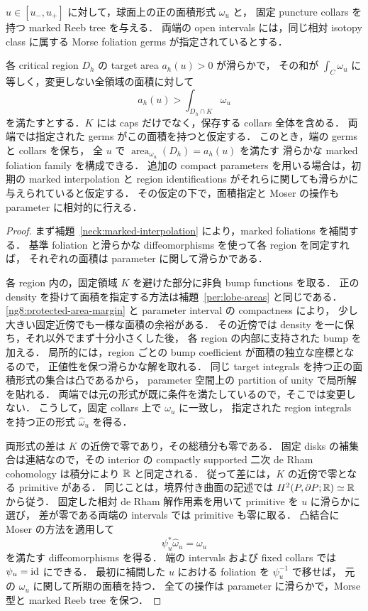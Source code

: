 \begin{lemma}
\label{ng8:parametric-moser}
$u\in[u_-,u_+]$ に対して，球面上の正の面積形式 $\omega_u$ と，
固定 puncture collars を持つ marked Reeb tree を与える．
両端の open intervals には，同じ相対 isotopy class に属する
Morse foliation germs が指定されているとする．

各 critical region $D_h$ の target area $a_h(u)>0$ が滑らかで，
その和が $\int_C\omega_u$ に等しく，変更しない全領域の面積に対して
\begin{equation}\label{ng8:protected-area-margin}
 a_h(u)>\int_{D_h\cap K}\omega_u
\end{equation}
を満たすとする．$K$ には caps だけでなく，保存する collars 全体を含める．
両端では指定された germs がこの面積を持つと仮定する．
このとき，端の germs と collars を保ち，
全 $u$ で $\operatorname{area}_{\omega_u}(D_h)=a_h(u)$ を満たす
滑らかな marked foliation family を構成できる．
追加の compact parameters を用いる場合は，初期の marked interpolation と
region identifications がそれらに関しても滑らかに与えられていると仮定する．
その仮定の下で，面積指定と Moser の操作も parameter に相対的に行える．
\end{lemma}

\begin{proof}
まず補題~\ref{neck:marked-interpolation} により，marked foliations を補間する．
基準 foliation と滑らかな diffeomorphisms を使って各 region を同定すれば，
それぞれの面積は parameter に関して滑らかである．

各 region 内の，固定領域 $K$ を避けた部分に非負 bump functions を取る．
正の density を掛けて面積を指定する方法は補題~\ref{per:lobe-areas} と同じである．
\eqref{ng8:protected-area-margin} と parameter interval の compactness により，
少し大きい固定近傍でも一様な面積の余裕がある．
その近傍では density を一に保ち，それ以外でまず十分小さくした後，
各 region の内部に支持された bump を加える．
局所的には，region ごとの bump coefficient が面積の独立な座標となるので，
正値性を保つ滑らかな解を取れる．
同じ target integrals を持つ正の面積形式の集合は凸であるから，
parameter 空間上の partition of unity で局所解を貼れる．
両端では元の形式が既に条件を満たしているので，そこでは変更しない．
こうして，固定 collars 上で $\omega_u$ に一致し，
指定された region integrals を持つ正の形式 $\widehat\omega_u$ を得る．

両形式の差は $K$ の近傍で零であり，その総積分も零である．
固定 disks の補集合は連結なので，その interior の compactly supported
二次 de Rham cohomology は積分により $\mathbb R$ と同定される．
従って差には，$K$ の近傍で零となる primitive がある．
同じことは，境界付き曲面の記述では $H^2(P,\partial P;\mathbb R)\simeq\mathbb R$ から従う．
固定した相対 de Rham 解作用素を用いて primitive を $u$ に滑らかに選び，
差が零である両端の intervals では primitive も零に取る．
凸結合に Moser の方法を適用して
\[
 \psi_u^*\widehat\omega_u=\omega_u
\]
を満たす diffeomorphisms を得る．
端の intervals および fixed collars では $\psi_u=\operatorname{id}$ にできる．
最初に補間した $u$ における foliation を $\psi_u^{-1}$ で移せば，
元の $\omega_u$ に関して所期の面積を持つ．
全ての操作は parameter に滑らかで，Morse 型と marked Reeb tree を保つ．
\end{proof}

